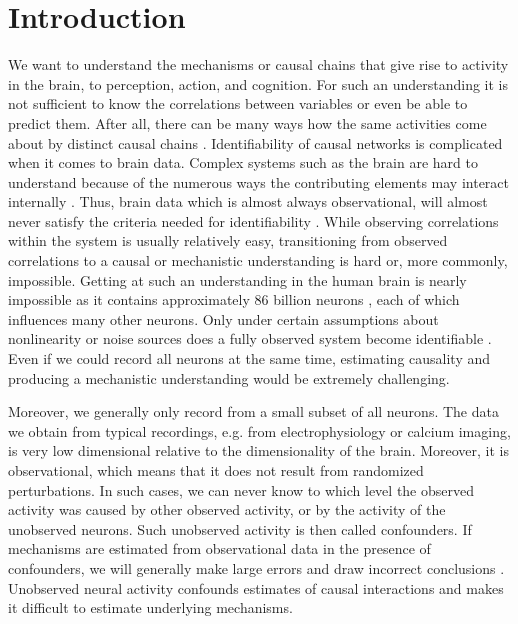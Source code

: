 \documentclass[11pt]{article}
\begin{document}
\section{Introduction}
We want to understand the mechanisms or causal chains that give rise to activity in the brain, to perception, action, and cognition. For such an understanding it is not sufficient to know the correlations between variables or even be able to predict them. After all, there can be many ways how the same activities come about by distinct causal chains \citep{drton2011global, peters2017elements}. Identifiability of causal networks is complicated when it comes to brain data. Complex systems such as the brain are hard to understand because of the numerous ways the contributing elements may interact internally \citep{Jonas2017}. Thus, brain data which is almost always observational, will almost never satisfy the criteria needed for identifiability \citep{pearl2009causality}. While observing correlations within the system is usually relatively easy, transitioning from observed correlations to a causal or mechanistic understanding is hard or, more commonly, impossible.  Getting at such an understanding in the human brain is nearly impossible as it contains approximately 86 billion neurons \citep{azevedo2009equal}, each of which influences many other neurons. Only under certain assumptions about nonlinearity or noise sources does a fully observed system become identifiable \citep{daniusis2012inferring,shimizu2006linear}. Even if we could record all neurons at the same time, estimating causality and producing a mechanistic understanding would be extremely challenging.

Moreover, we generally only record from a small subset of all neurons. The data we obtain from typical recordings, e.g. from electrophysiology  or calcium imaging, is very low dimensional relative to the dimensionality of the brain. Moreover, it is observational, which means that it does not result from randomized perturbations. In such cases, we can never know to which level the observed activity was caused by other observed activity, or by the activity of the unobserved neurons. Such unobserved activity is then called confounders. If mechanisms are estimated from observational data in the presence of confounders, we will generally make large errors and draw incorrect conclusions \citep{angrist2008mostly}. Unobserved neural activity confounds estimates of causal interactions and makes it difficult to estimate underlying mechanisms.
\end{document}
